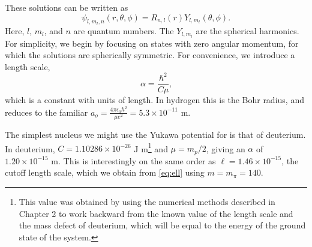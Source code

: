 \documentclass[12pt,twoside]{reedthesis}
\newcommand{\eqn}[1]{\begin{equation}#1\end{equation}}
\begin{document}
These solutions can be written as \cite{griffiths_introduction_2005}
\eqn{
\psi_{l, m_l, n} (r, \theta, \phi) = R_{n,l}(r) Y_{l,m_l}(\theta,\phi)\mbox{.}
}
Here, $l$, $m_l$, and $n$ are quantum numbers. The $Y_{l, m_l}$ are the spherical harmonics. For simplicity, we begin by focusing on states with zero angular momentum, for which the solutions are spherically symmetric.
For convenience, we introduce a length scale, 
\eqn{
\alpha = \frac{\hbar^2}{C \mu}\mbox{,}
\label{eq:bohrradius}
}
which is a constant with units of length. 
In hydrogen this is the Bohr radius, and reduces to the familiar $a_o = \frac{4\pi \epsilon_0 \hbar^2}{\mu e^2} = 5.3 \times 10^{-11}$ m. 

The simplest nucleus we might use the Yukawa potential for is that of deuterium. In deuterium, $C =  1.10286 \times 10^{-26}$ J m\footnote{This value was obtained by using the numerical methods described in Chapter 2 to work backward from the known value of the length scale and the mass defect of deuterium, which will be equal to the energy of the ground state of the system.} and $\mu = m_p/2$, giving an $\alpha$ of $1.20 \times 10^{-15}$ m. This is interestingly on the same order as $\ell = 1.46 \times 10^{-15}$, the cutoff length scale, which we obtain from \eqref{eq:ell} using $m = m_{\pi} = 140$.
\end{document}
